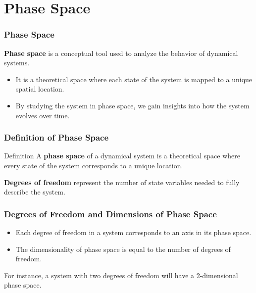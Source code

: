 \documentclass{beamer}
\begin{document}
\section{Phase Space}
\begin{frame}
    \frametitle{Phase Space}

    \textbf{Phase space} is a conceptual tool used to analyze the behavior of dynamical systems.

    \begin{itemize}
        \item It is a theoretical space where each state of the system is mapped to a unique spatial location.
        \item By studying the system in phase space, we gain insights into how the system evolves over time.
    \end{itemize}

\end{frame}

\begin{frame}
    \frametitle{Definition of Phase Space}

    \begin{block}{Definition}
        A \textbf{phase space} of a dynamical system is a theoretical space where every state of the system corresponds to a unique location.
    \end{block}

    \bigskip

    \textbf{Degrees of freedom} represent the number of state variables needed to fully describe the system.
\end{frame}

\begin{frame}
    \frametitle{Degrees of Freedom and Dimensions of Phase Space}

    \begin{itemize}
        \item Each degree of freedom in a system corresponds to an axis in its phase space.
        \item The dimensionality of phase space is equal to the number of degrees of freedom.
    \end{itemize}

    \bigskip

    For instance, a system with two degrees of freedom will have a 2-dimensional phase space.
\end{frame}
\end{document}
